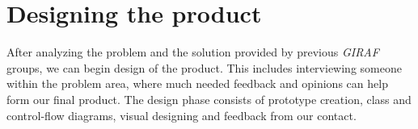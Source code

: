 \chapter{Designing the product}
After analyzing the problem and the solution provided by previous \textit{GIRAF} groups, we can begin design of the product.
This includes interviewing someone within the problem area, where much needed feedback and opinions can help form our final product.
The design phase consists of prototype creation, class and control-flow diagrams, visual designing and feedback from our contact.

